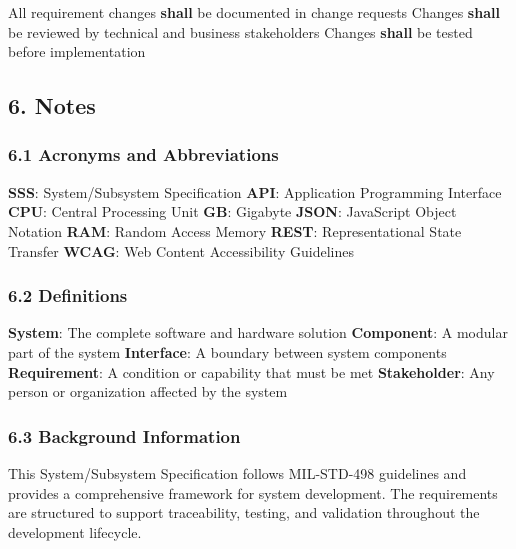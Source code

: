 All requirement changes \textbf{shall} be documented in change requests
Changes \textbf{shall} be reviewed by technical and business stakeholders
Changes \textbf{shall} be tested before implementation

\subsection{6. Notes}

\subsubsection{6.1 Acronyms and Abbreviations}
\textbf{SSS}: System/Subsystem Specification
\textbf{API}: Application Programming Interface
\textbf{CPU}: Central Processing Unit
\textbf{GB}: Gigabyte
\textbf{JSON}: JavaScript Object Notation
\textbf{RAM}: Random Access Memory
\textbf{REST}: Representational State Transfer
\textbf{WCAG}: Web Content Accessibility Guidelines

\subsubsection{6.2 Definitions}
\textbf{System}: The complete software and hardware solution
\textbf{Component}: A modular part of the system
\textbf{Interface}: A boundary between system components
\textbf{Requirement}: A condition or capability that must be met
\textbf{Stakeholder}: Any person or organization affected by the system

\subsubsection{6.3 Background Information}

This System/Subsystem Specification follows MIL-STD-498 guidelines and provides a comprehensive framework for system development. The requirements are structured to support traceability, testing, and validation throughout the development lifecycle.

